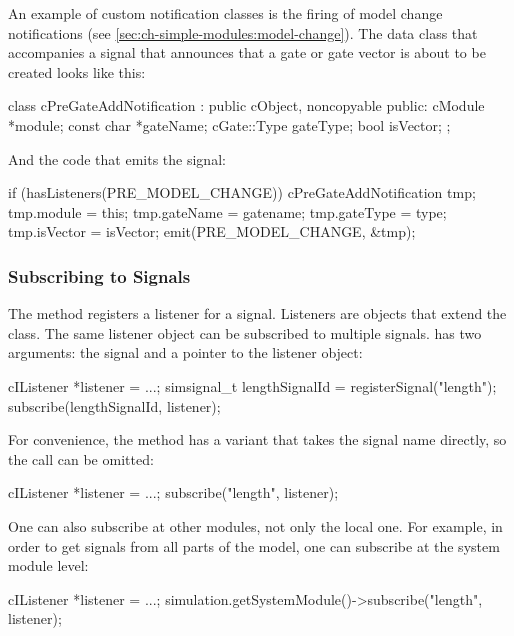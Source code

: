 An example of custom notification classes is the firing of model change notifications
(see \ref{sec:ch-simple-modules:model-change}). The data class
that accompanies a signal that announces that a gate or gate vector is
about to be created looks like this:

\begin{cpp}
class cPreGateAddNotification : public cObject, noncopyable
{
  public:
    cModule *module;
    const char *gateName;
    cGate::Type gateType;
    bool isVector;
};
\end{cpp}

And the code that emits the signal:

\begin{cpp}
if (hasListeners(PRE_MODEL_CHANGE))
{
    cPreGateAddNotification tmp;
    tmp.module = this;
    tmp.gateName = gatename;
    tmp.gateType = type;
    tmp.isVector = isVector;
    emit(PRE_MODEL_CHANGE, &tmp);
}
\end{cpp}


\subsubsection{Subscribing to Signals}

The  method registers a listener for a signal.
Listeners are objects that extend the  class.
The same listener object can be subscribed to multiple signals.
 has two arguments: the signal and a pointer to
the listener object:

\begin{cpp}
cIListener *listener = ...;
simsignal_t lengthSignalId = registerSignal("length");
subscribe(lengthSignalId, listener);
\end{cpp}

For convenience, the  method has a variant
that takes the signal name directly, so the 
call can be omitted:

\begin{cpp}
cIListener *listener = ...;
subscribe("length", listener);
\end{cpp}

One can also subscribe at other modules, not only the local one.
For example, in order to get signals from all parts of the model,
one can subscribe at the system module level:

\begin{cpp}
cIListener *listener = ...;
simulation.getSystemModule()->subscribe("length", listener);
\end{cpp}

